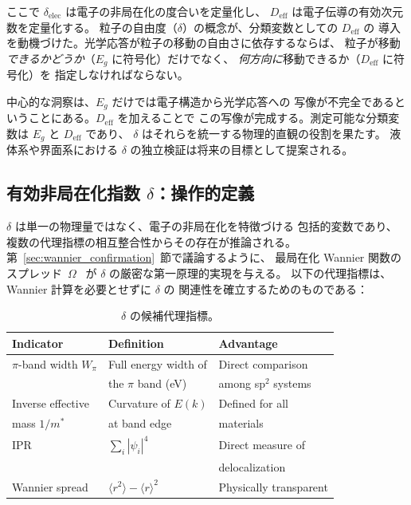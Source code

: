 \documentclass[twocolumn,showpacs,preprintnumbers,amsmath,amssymb,prb]{revtex4-2}
\begin{document}
\noindent ここで $\delta_\mathrm{elec}$ は電子の非局在化の度合いを定量化し、
$D_\mathrm{eff}$ は電子伝導の有効次元数を定量化する。
粒子の自由度（$\delta$）の概念が、分類変数としての $D_\mathrm{eff}$ の
導入を動機づけた。光学応答が粒子の移動の自由さに依存するならば、
粒子が移動\emph{できるかどうか}（$E_g$ に符号化）だけでなく、
\emph{何方向に}移動できるか（$D_\mathrm{eff}$ に符号化）を
指定しなければならない。

中心的な洞察は、$E_g$ だけでは電子構造から光学応答への
写像が不完全であるということにある。$D_\mathrm{eff}$ を加えることで
この写像が完成する。測定可能な分類変数は $E_g$ と $D_\mathrm{eff}$ であり、
$\delta$ はそれらを統一する物理的直観の役割を果たす。
液体系や界面系における $\delta$ の独立検証は将来の目標として提案される。

\subsection{有効非局在化指数 $\delta$：操作的定義}

$\delta$ は単一の物理量ではなく、電子の非局在化を特徴づける
包括的変数であり、複数の代理指標の相互整合性からその存在が推論される。
第~\ref{sec:wannier_confirmation}~節で議論するように、
最局在化 Wannier 関数のスプレッド~$\Omega$~\cite{Marzari1997} が
$\delta$ の厳密な第一原理的実現を与える。
以下の代理指標は、Wannier 計算を必要とせずに $\delta$ の
関連性を確立するためのものである：

\begin{table}[h]
\caption{$\delta$ の候補代理指標。}
\label{tab:delta_proxies}
\begin{ruledtabular}
\begin{tabular}{lll}
  Indicator & Definition & Advantage \\
  \hline
  $\pi$-band width $W_\pi$ & Full energy width of & Direct comparison \\
   & the $\pi$ band (eV) & among sp$^2$ systems \\
  Inverse effective & Curvature of $E(k)$ & Defined for all \\
  mass $1/m^*$ & at band edge & materials \\
  IPR & $\sum_i |\psi_i|^4$ & Direct measure of \\
   & & delocalization \\
  Wannier spread & $\langle r^2 \rangle - \langle r \rangle^2$ &
  Physically transparent \\
\end{tabular}
\end{ruledtabular}
\end{table}
\end{document}
